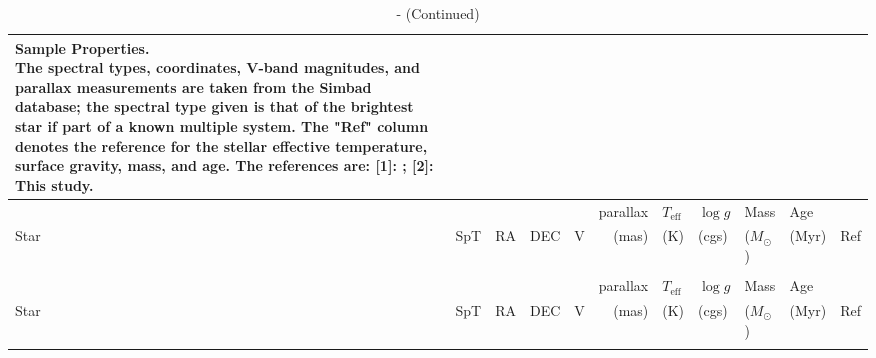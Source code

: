 \begin{landscape}
\begin{scriptsize}
\begin{longtable}{|l|lrrrrlllll|}
    
    \caption{Sample Properties.\\
             The spectral types, coordinates, V-band magnitudes, and parallax measurements are taken from the Simbad database; the spectral type given is that of the brightest star if part of a known multiple system. The "Ref" column denotes the reference for the stellar effective temperature, surface gravity, mass, and age. The references are: [1]: \citep{David2015}; [2]: This study. \label{paper6_tab:sample}} 
    \\ \hline
      &  &  &  &  & parallax & $T_\mathrm{eff}$ & $\log{g}$ & Mass & Age &  \\
       Star & SpT & RA & DEC &  V &  (mas) & (K) & (cgs) & ($M_{\odot}$) & (Myr) & Ref \\ \hline
    \endfirsthead

    \caption{ - (Continued)}
    \\ \hline
    &  &  &  &  & parallax & $T_\mathrm{eff}$ & $\log{g}$ & Mass & Age &  \\
       Star & SpT & RA & DEC &  V &  (mas) & (K) & (cgs) & ($M_{\odot}$) & (Myr) & Ref \\ \hline
    \endhead

    \hline
    \endfoot

    \hline
    \endlastfoot


\end{longtable}
\end{scriptsize}
\end{landscape}
